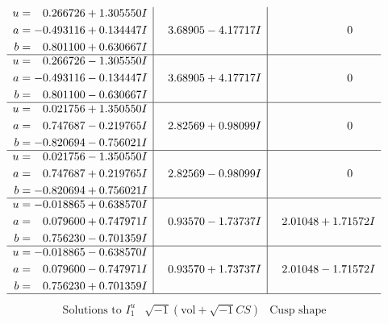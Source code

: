 \documentclass[1p]{elsarticle_modified}
\theoremstyle{definition}
\newcommand{\I}{\sqrt{-1}}
\begin{document}
$$\begin{array}{c|c|c}
\begin{aligned}
u &= \phantom{-}0.266726 + 1.305550 I \\
a &= -0.493116 + 0.134447 I \\
b &= \phantom{-}0.801100 + 0.630667 I\end{aligned}
 & \phantom{-}3.68905 - 4.17717 I & \phantom{-0.000000 } 0 \\ \hline\begin{aligned}
u &= \phantom{-}0.266726 - 1.305550 I \\
a &= -0.493116 - 0.134447 I \\
b &= \phantom{-}0.801100 - 0.630667 I\end{aligned}
 & \phantom{-}3.68905 + 4.17717 I & \phantom{-0.000000 } 0 \\ \hline\begin{aligned}
u &= \phantom{-}0.021756 + 1.350550 I \\
a &= \phantom{-}0.747687 - 0.219765 I \\
b &= -0.820694 - 0.756021 I\end{aligned}
 & \phantom{-}2.82569 + 0.98099 I & \phantom{-0.000000 } 0 \\ \hline\begin{aligned}
u &= \phantom{-}0.021756 - 1.350550 I \\
a &= \phantom{-}0.747687 + 0.219765 I \\
b &= -0.820694 + 0.756021 I\end{aligned}
 & \phantom{-}2.82569 - 0.98099 I & \phantom{-0.000000 } 0 \\ \hline\begin{aligned}
u &= -0.018865 + 0.638570 I \\
a &= \phantom{-}0.079600 + 0.747971 I \\
b &= \phantom{-}0.756230 - 0.701359 I\end{aligned}
 & \phantom{-}0.93570 - 1.73737 I & \phantom{-}2.01048 + 1.71572 I \\ \hline\begin{aligned}
u &= -0.018865 - 0.638570 I \\
a &= \phantom{-}0.079600 - 0.747971 I \\
b &= \phantom{-}0.756230 + 0.701359 I\end{aligned}
 & \phantom{-}0.93570 + 1.73737 I & \phantom{-}2.01048 - 1.71572 I\\
 \hline 
 \end{array}$$\newpage$$\begin{array}{c|c|c}  
\text{Solutions to }I^u_{1}& \I (\text{vol} + \sqrt{-1}CS) & \text{Cusp shape}\\

\end{array}$$
\end{document}
